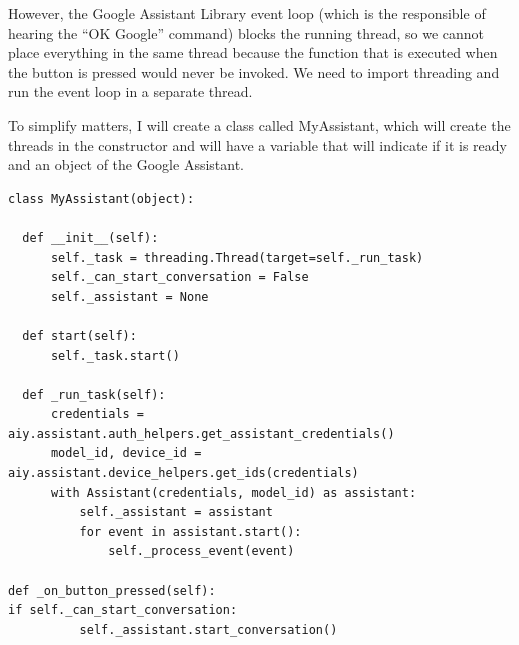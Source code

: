 However, the Google Assistant Library event loop (which is the responsible of hearing the “OK Google” command) blocks the running 
thread, so we cannot place everything in the same thread because the function that is executed when the button is pressed would 
never be invoked. We need to import threading and run the event loop in a separate thread.

To simplify matters, I will create a class called MyAssistant, which will create the threads in the constructor and will have a 
variable that will indicate if it is ready and an object of the Google Assistant.

\begin{lstlisting}[style=PythonCode]
class MyAssistant(object):

  def __init__(self):
      self._task = threading.Thread(target=self._run_task)
      self._can_start_conversation = False
      self._assistant = None

  def start(self):
      self._task.start()

  def _run_task(self):
      credentials = aiy.assistant.auth_helpers.get_assistant_credentials()
      model_id, device_id = aiy.assistant.device_helpers.get_ids(credentials)
      with Assistant(credentials, model_id) as assistant:
          self._assistant = assistant
          for event in assistant.start():
              self._process_event(event)

def _on_button_pressed(self):
if self._can_start_conversation:
          self._assistant.start_conversation()
\end{lstlisting}

